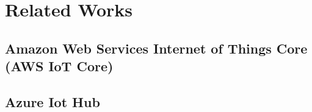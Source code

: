 \chapter{Related Works}

\section{Amazon Web Services Internet of Things Core (AWS IoT Core)}

\section{Azure Iot Hub}